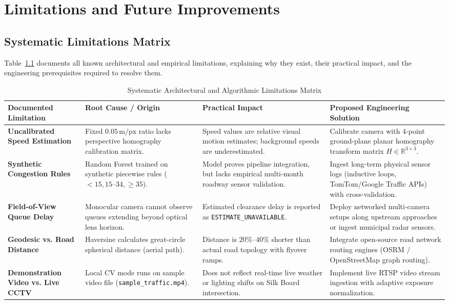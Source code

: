 \chapter{Limitations and Future Improvements}

\section{Systematic Limitations Matrix}
Table~\ref{tab:limitations_matrix} documents all known architectural and empirical limitations, explaining why they exist, their practical impact, and the engineering prerequisites required to resolve them.

\begin{table}[h!]
\centering
\small
\begin{tabularx}{\textwidth}{p{3.2cm} p{3.2cm} p{3.2cm} X}
\toprule
\textbf{Documented Limitation} & \textbf{Root Cause / Origin} & \textbf{Practical Impact} & \textbf{Proposed Engineering Solution} \\
\midrule
\textbf{Uncalibrated Speed Estimation} & Fixed $0.05\,\text{m/px}$ ratio lacks perspective homography calibration matrix. & Speed values are relative visual motion estimates; background speeds are underestimated. & Calibrate camera with 4-point ground-plane planar homography transform matrix $H \in \mathbb{R}^{3 \times 3}$. \\
\textbf{Synthetic Congestion Rules} & Random Forest trained on synthetic piecewise rules ($<15, 15\text{--}34, \ge 35$). & Model proves pipeline integration, but lacks empirical multi-month roadway sensor validation. & Ingest long-term physical sensor logs (inductive loops, TomTom/Google Traffic APIs) with cross-validation. \\
\textbf{Field-of-View Queue Delay} & Monocular camera cannot observe queues extending beyond optical lens horizon. & Estimated clearance delay is reported as \texttt{ESTIMATE\_UNAVAILABLE}. & Deploy networked multi-camera setups along upstream approaches or ingest municipal radar sensors. \\
\textbf{Geodesic vs. Road Distance} & Haversine calculates great-circle spherical distance (aerial path). & Distance is $20\%\text{--}40\%$ shorter than actual road topology with flyover ramps. & Integrate open-source road network routing engines (OSRM / OpenStreetMap graph routing). \\
\textbf{Demonstration Video vs. Live CCTV} & Local CV mode runs on sample video file (\texttt{sample\_traffic.mp4}). & Does not reflect real-time live weather or lighting shifts on Silk Board intersection. & Implement live RTSP video stream ingestion with adaptive exposure normalization. \\
\bottomrule
\end{tabularx}
\caption{Systematic Architectural and Algorithmic Limitations Matrix}
\label{tab:limitations_matrix}
\end{table}

